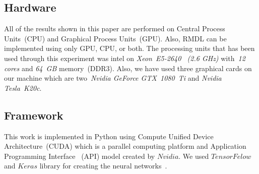 \documentclass[sigconf, final]{acmart}
\begin{document}
\subsection{Hardware}
All of the results shown in this paper are performed on Central Process Units~(CPU) and Graphical Process Units~(GPU). Also, RMDL can be implemented using only GPU, CPU, or both. The processing units that has been used through this experiment was intel on \textit{Xeon~E5-2640~ (2.6 GHz)} with~\textit{12 cores} and \textit{64~GB} memory~(DDR3). Also, we have used three graphical cards on our machine which are two~\textit{Nvidia GeForce GTX~1080~Ti} and \textit{Nvidia Tesla~K20c}.
\subsection{Framework}
This work is implemented in Python using Compute Unified Device Architecture~(CUDA) which is a parallel computing platform and Application Programming Interface ~(API) model created by $Nvidia$. We used $TensorFelow$ and $Keras$ library for creating the neural networks~\cite{abadi2016tensorflow,chollet2015keras}. 
\end{document}
